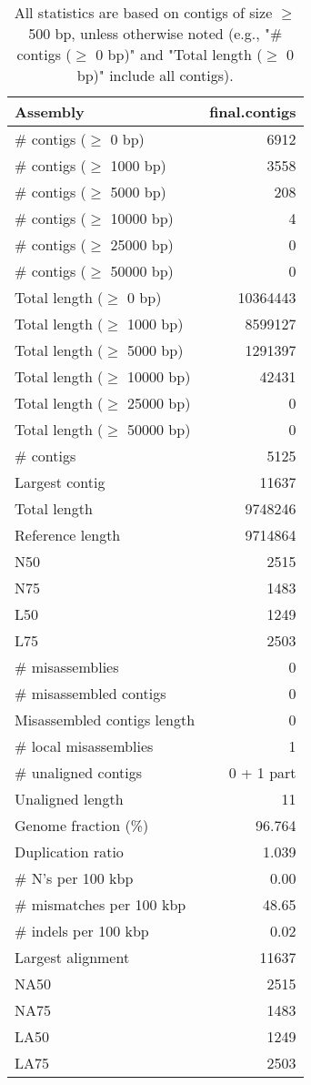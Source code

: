 \documentclass[12pt,a4paper]{article}
\begin{document}
\begin{table}[ht]
\begin{center}
\caption{All statistics are based on contigs of size $\geq$ 500 bp, unless otherwise noted (e.g., "\# contigs ($\geq$ 0 bp)" and "Total length ($\geq$ 0 bp)" include all contigs).}
\begin{tabular}{|l*{1}{|r}|}
\hline
Assembly & final.contigs \\ \hline
\# contigs ($\geq$ 0 bp) & 6912 \\ \hline
\# contigs ($\geq$ 1000 bp) & 3558 \\ \hline
\# contigs ($\geq$ 5000 bp) & 208 \\ \hline
\# contigs ($\geq$ 10000 bp) & 4 \\ \hline
\# contigs ($\geq$ 25000 bp) & 0 \\ \hline
\# contigs ($\geq$ 50000 bp) & 0 \\ \hline
Total length ($\geq$ 0 bp) & 10364443 \\ \hline
Total length ($\geq$ 1000 bp) & 8599127 \\ \hline
Total length ($\geq$ 5000 bp) & 1291397 \\ \hline
Total length ($\geq$ 10000 bp) & 42431 \\ \hline
Total length ($\geq$ 25000 bp) & 0 \\ \hline
Total length ($\geq$ 50000 bp) & 0 \\ \hline
\# contigs & 5125 \\ \hline
Largest contig & 11637 \\ \hline
Total length & 9748246 \\ \hline
Reference length & 9714864 \\ \hline
N50 & 2515 \\ \hline
N75 & 1483 \\ \hline
L50 & 1249 \\ \hline
L75 & 2503 \\ \hline
\# misassemblies & 0 \\ \hline
\# misassembled contigs & 0 \\ \hline
Misassembled contigs length & 0 \\ \hline
\# local misassemblies & 1 \\ \hline
\# unaligned contigs & 0 + 1 part \\ \hline
Unaligned length & 11 \\ \hline
Genome fraction (\%) & 96.764 \\ \hline
Duplication ratio & 1.039 \\ \hline
\# N's per 100 kbp & 0.00 \\ \hline
\# mismatches per 100 kbp & 48.65 \\ \hline
\# indels per 100 kbp & 0.02 \\ \hline
Largest alignment & 11637 \\ \hline
NA50 & 2515 \\ \hline
NA75 & 1483 \\ \hline
LA50 & 1249 \\ \hline
LA75 & 2503 \\ \hline
\end{tabular}
\end{center}
\end{table}
\end{document}
